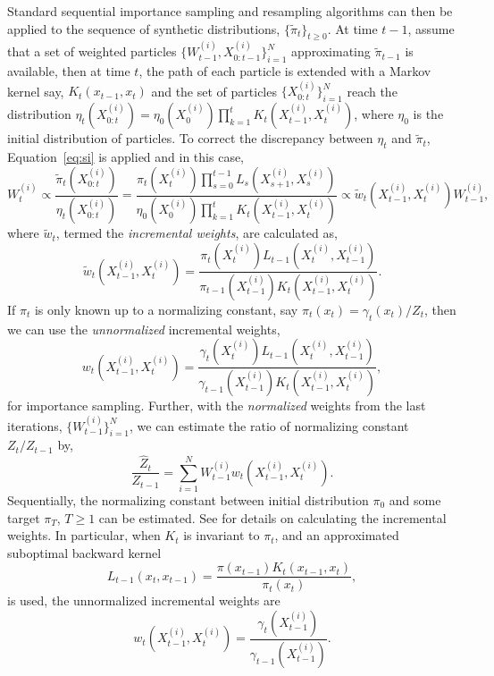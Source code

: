 \documentclass[11pt, fontset=Minion, showoverfull,
bib, mintcode, minted=cache]{marticle}
\begin{document}
Standard sequential importance sampling and resampling algorithms can then be
applied to the sequence of synthetic distributions, $\{\tilde\pi_t\}_{t\ge0}$.
At time $t - 1$, assume that a set of weighted particles
$\{W_{t-1}^{(i)},X_{0:t-1}^{(i)}\}_{i=1}^N$ approximating $\tilde\pi_{t-1}$ is
available, then at time $t$, the path of each particle is extended with a
Markov kernel say, $K_t(x_{t-1}, x_t)$ and the set of particles
$\{X_{0:t}^{(i)}\}_{i=1}^N$ reach the distribution $\eta_t(X_{0:t}^{(i)}) =
\eta_0(X_0^{(i)})\prod_{k=1}^tK_t(X_{t-1}^{(i)}, X_t^{(i)})$, where $\eta_0$
is the initial distribution of particles. To correct the discrepancy between
$\eta_t$ and $\tilde\pi_t$, Equation~\ref{eq:si} is applied and in this case,
\begin{equation}
  W_t^{(i)} \propto \frac{\tilde\pi_t(X_{0:t}^{(i)})}{\eta_t(X_{0:t}^{(i)})}
  = \frac{\pi_t(X_t^{(i)})\prod_{s=0}^{t-1}L_s(X_{s+1}^{(i)}, X_s^{(i)})}
  {\eta_0(X_0^{(i)})\prod_{k=1}^tK_t(X_{t-1}^{(i)},X_t^{(i)})}
  \propto \tilde{w}_t(X_{t-1}^{(i)}, X_t^{(i)})W_{t-1}^{(i)},
\end{equation}
where $\tilde{w}_t$, termed the \emph{incremental weights}, are calculated as,
\begin{equation}
  \tilde{w}_t(X_{t-1}^{(i)},X_t^{(i)}) =
  \frac{\pi_t(X_t^{(i)})L_{t-1}(X_t^{(i)}, X_{t-1}^{(i)})}
  {\pi_{t-1}(X_{t-1}^{(i)})K_t(X_{t-1}^{(i)}, X_t^{(i)})}.
\end{equation}
If $\pi_t$ is only known up to a normalizing constant, say $\pi_t(x_t) =
\gamma_t(x_t)/Z_t$, then we can use the \emph{unnormalized} incremental
weights,
\begin{equation}
  w_t(X_{t-1}^{(i)},X_t^{(i)}) =
  \frac{\gamma_t(X_t^{(i)})L_{t-1}(X_t^{(i)}, X_{t-1}^{(i)})}
  {\gamma_{t-1}(X_{t-1}^{(i)})K_t(X_{t-1}^{(i)}, X_t^{(i)})},
\end{equation}
for importance sampling. Further, with the \emph{normalized} weights from the
last iterations, $\{W_{t-1}^{(i)}\}_{i=1}^N$, we can estimate the ratio of
normalizing constant $Z_t/Z_{t-1}$ by,
\begin{equation}
  \frac{\hat{Z}_t}{Z_{t-1}} =
  \sum_{i=1}^N W_{t-1}^{(i)}w_t(X_{t-1}^{(i)},X_t^{(i)}).
\end{equation}
Sequentially, the normalizing constant between initial distribution $\pi_0$
and some target $\pi_T$, $T\ge1$ can be estimated. See \textcite{DelMoral:2006hc}
for details on  calculating the incremental weights. In particular, when $K_t$
is invariant to $\pi_t$, and an approximated suboptimal backward kernel
\begin{equation}
  L_{t-1}(x_t, x_{t-1}) = \frac{\pi(x_{t-1})K_t(x_{t-1}, x_t)}{\pi_t(x_t)},
\end{equation}
is used, the unnormalized incremental weights are
\begin{equation}
  w_t(X_{t-1}^{(i)},X_t^{(i)}) =
  \frac{\gamma_t(X_{t-1}^{(i)})}{\gamma_{t-1}(X_{t-1}^{(i)})}.
  \label{eq:inc_weight_mcmc}
\end{equation}
\end{document}
